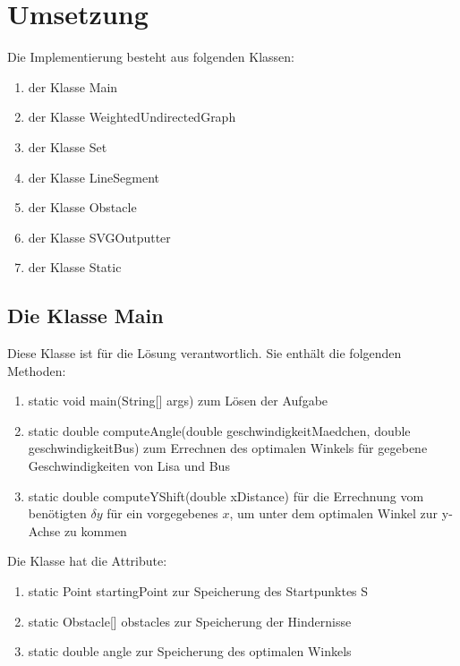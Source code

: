 \documentclass[a4paper,10pt,ngerman]{scrartcl}
\begin{document}
\section{Umsetzung}
Die Implementierung besteht aus folgenden Klassen:
\begin{enumerate}
\item der Klasse Main
\item der Klasse WeightedUndirectedGraph
\item der Klasse Set
\item der Klasse LineSegment
\item der Klasse Obstacle
\item der Klasse SVGOutputter
\item der Klasse Static
\end{enumerate}

\subsection{Die Klasse Main}
Diese Klasse ist für die Lösung verantwortlich. Sie enthält die folgenden Methoden:
\begin{enumerate}
\item static void main(String[] args) zum Lösen der Aufgabe
\item static double computeAngle(double geschwindigkeitMaedchen, double geschwindigkeitBus) zum Errechnen des optimalen Winkels für gegebene Geschwindigkeiten von Lisa und Bus
\item static double computeYShift(double xDistance) für die Errechnung vom benötigten $\delta y$ für ein vorgegebenes $x$, um unter dem optimalen Winkel zur y-Achse zu kommen
\end{enumerate}
Die Klasse hat die Attribute:
\begin{enumerate}
\item static Point startingPoint zur Speicherung des Startpunktes S
\item static Obstacle[] obstacles zur Speicherung der Hindernisse
\item static double angle zur Speicherung des optimalen Winkels
\end{enumerate}
\end{document}
